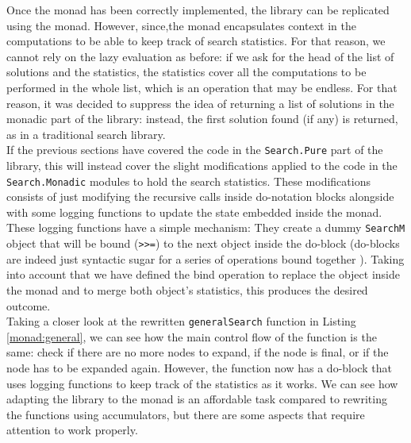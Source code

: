 Once the monad has been correctly implemented, the library can be replicated
using the monad. However, since,the monad encapsulates context in the
computations to be able to keep track of search statistics. For that reason,
we cannot rely on the lazy evaluation as before: if we ask for the head of the
list of solutions and the statistics, the statistics cover all the computations
to be performed in the whole list, which is an operation that may be endless.
For that reason, it was decided to suppress the idea of returning a list of
solutions in the monadic part of the library: instead, the first solution found
(if any) is returned, as in a traditional search library.\\

If the previous sections have covered the code in the \texttt{Search.Pure} part
of the library, this will instead cover the slight modifications applied to the
code in the \texttt{Search.Monadic} modules to hold the search statistics.
These modifications consists of just modifying the recursive calls inside
do-notation blocks alongside with some logging functions to update the state
embedded inside the monad.\\

These logging functions have a simple mechanism: They create a dummy
\texttt{SearchM} object that will be bound (\texttt{>>=}) to the next object
inside the do-block (do-blocks are indeed just syntactic sugar for a series of
operations bound together \cite{haskell-2010}). Taking into account that we have
defined the bind operation to replace the object inside the monad and to merge
both object's statistics, this produces the desired outcome.\\

Taking a closer look at the rewritten \texttt{generalSearch} function in
Listing \ref{monad:general}, we can see how the main control flow of the
function is the same: check if there are no more nodes to expand, if the node
is final, or if the node has to be expanded again. However, the function now
has a do-block that uses logging functions to keep track of the statistics as
it works. We can see how adapting the library to the monad is an affordable
task compared to rewriting the functions using accumulators, but there are some
aspects that require attention to work properly.\\


